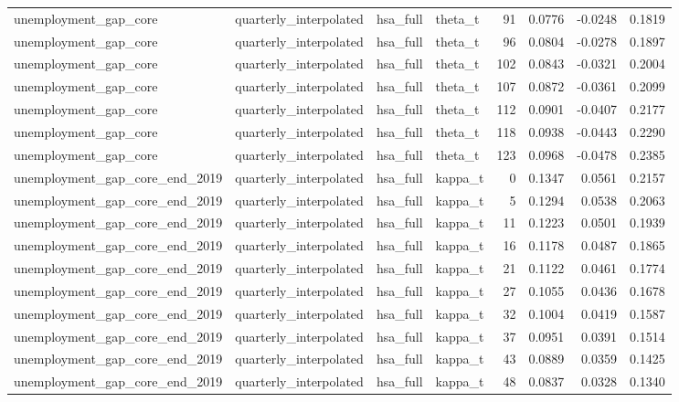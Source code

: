\begin{tabular}{llllrrrr}
unemployment\_gap\_core & quarterly\_interpolated & hsa\_full & theta\_t & 91 & 0.0776 & -0.0248 & 0.1819 \\
unemployment\_gap\_core & quarterly\_interpolated & hsa\_full & theta\_t & 96 & 0.0804 & -0.0278 & 0.1897 \\
unemployment\_gap\_core & quarterly\_interpolated & hsa\_full & theta\_t & 102 & 0.0843 & -0.0321 & 0.2004 \\
unemployment\_gap\_core & quarterly\_interpolated & hsa\_full & theta\_t & 107 & 0.0872 & -0.0361 & 0.2099 \\
unemployment\_gap\_core & quarterly\_interpolated & hsa\_full & theta\_t & 112 & 0.0901 & -0.0407 & 0.2177 \\
unemployment\_gap\_core & quarterly\_interpolated & hsa\_full & theta\_t & 118 & 0.0938 & -0.0443 & 0.2290 \\
unemployment\_gap\_core & quarterly\_interpolated & hsa\_full & theta\_t & 123 & 0.0968 & -0.0478 & 0.2385 \\
unemployment\_gap\_core\_end\_2019 & quarterly\_interpolated & hsa\_full & kappa\_t & 0 & 0.1347 & 0.0561 & 0.2157 \\
unemployment\_gap\_core\_end\_2019 & quarterly\_interpolated & hsa\_full & kappa\_t & 5 & 0.1294 & 0.0538 & 0.2063 \\
unemployment\_gap\_core\_end\_2019 & quarterly\_interpolated & hsa\_full & kappa\_t & 11 & 0.1223 & 0.0501 & 0.1939 \\
unemployment\_gap\_core\_end\_2019 & quarterly\_interpolated & hsa\_full & kappa\_t & 16 & 0.1178 & 0.0487 & 0.1865 \\
unemployment\_gap\_core\_end\_2019 & quarterly\_interpolated & hsa\_full & kappa\_t & 21 & 0.1122 & 0.0461 & 0.1774 \\
unemployment\_gap\_core\_end\_2019 & quarterly\_interpolated & hsa\_full & kappa\_t & 27 & 0.1055 & 0.0436 & 0.1678 \\
unemployment\_gap\_core\_end\_2019 & quarterly\_interpolated & hsa\_full & kappa\_t & 32 & 0.1004 & 0.0419 & 0.1587 \\
unemployment\_gap\_core\_end\_2019 & quarterly\_interpolated & hsa\_full & kappa\_t & 37 & 0.0951 & 0.0391 & 0.1514 \\
unemployment\_gap\_core\_end\_2019 & quarterly\_interpolated & hsa\_full & kappa\_t & 43 & 0.0889 & 0.0359 & 0.1425 \\
unemployment\_gap\_core\_end\_2019 & quarterly\_interpolated & hsa\_full & kappa\_t & 48 & 0.0837 & 0.0328 & 0.1340 \\

\end{tabular}
